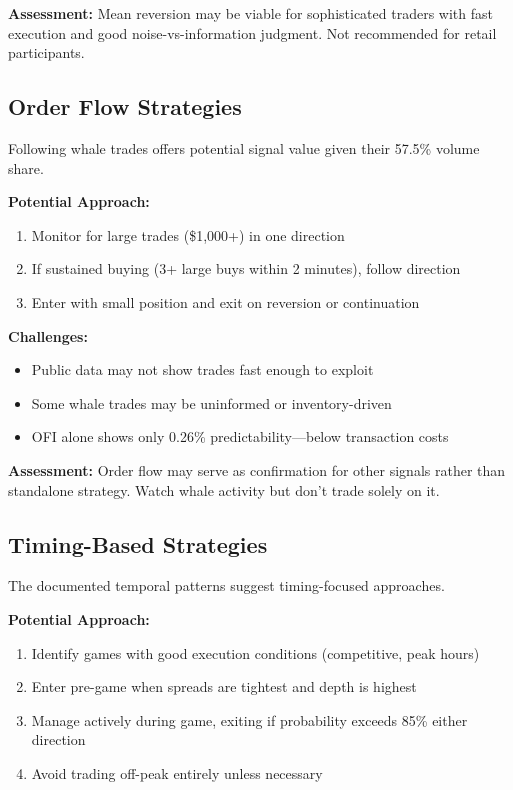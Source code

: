 \textbf{Assessment:} Mean reversion may be viable for sophisticated traders with fast execution and good noise-vs-information judgment. Not recommended for retail participants.

\subsection{Order Flow Strategies}

Following whale trades offers potential signal value given their 57.5\% volume share.

\textbf{Potential Approach:}
\begin{enumerate}
    \item Monitor for large trades (\$1,000+) in one direction
    \item If sustained buying (3+ large buys within 2 minutes), follow direction
    \item Enter with small position and exit on reversion or continuation
\end{enumerate}

\textbf{Challenges:}
\begin{itemize}
    \item Public data may not show trades fast enough to exploit
    \item Some whale trades may be uninformed or inventory-driven
    \item OFI alone shows only 0.26\% predictability---below transaction costs
\end{itemize}

\textbf{Assessment:} Order flow may serve as confirmation for other signals rather than standalone strategy. Watch whale activity but don't trade solely on it.

\subsection{Timing-Based Strategies}

The documented temporal patterns suggest timing-focused approaches.

\textbf{Potential Approach:}
\begin{enumerate}
    \item Identify games with good execution conditions (competitive, peak hours)
    \item Enter pre-game when spreads are tightest and depth is highest
    \item Manage actively during game, exiting if probability exceeds 85\% either direction
    \item Avoid trading off-peak entirely unless necessary
\end{enumerate}

